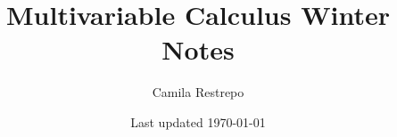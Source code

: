 \documentclass{notes}
\title{\bfseries Multivariable Calculus Winter Notes}
\author{Camila Restrepo}
\date{Last updated \today}
\begin{document}
\maketitle
\toccontents
\frontpagewarning




\end{document}
